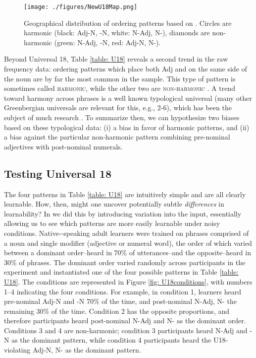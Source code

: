 \documentclass[output=paper]{langsci/langscibook}
\begin{document}
\begin{figure}[t]
\texttt{[image: ./figures/NewU18Map.png]}
\caption{Geographical distribution of ordering patterns based on \cite{wals-87,wals-89}. Circles are harmonic (black: Adj-N, -N, white: N-Adj, N-), diamonds are non-harmonic (green: N-Adj, -N, red: Adj-N, N-).}\label{fig: U18}
\end{figure}


Beyond Universal 18, Table \ref{table: U18} reveals a second trend in the raw frequency data: ordering patterns which place both Adj and  on the same side of the noun are by far the most common in the sample. This type of pattern is sometimes called  \textsc{harmonic}, while the other two are \textsc{non-harmonic} \citep[for discussion of this terminology see][59-62]{croft2003typology}. A trend toward harmony across phrases is a well known typological universal (many other Greenbergian universals are relevant for this, e.g., 2-6), which has been the subject of much research \citep[e.g.,][]{Hawkins83,Travis84,Chomsky88,Dryer92,Baker01}. To summarize then, we can hypothesize two biases based on these typological data: (i) a bias  in favor of harmonic patterns, and (ii) a bias against the particular non-harmonic pattern combining pre-nominal adjectives with post-nominal numerals. 

\subsection{Testing Universal 18}
The four patterns in Table \ref{table: U18} are intuitively simple and are all clearly learnable. How, then, might one uncover potentially subtle \textit{differences} in learnability? In \cite{CulbertsonSmolenskyLegendre12} we did this by introducing variation into the input, essentially allowing us to see which patterns are more easily learnable under noisy conditions. Native--speaking adult learners were trained on phrases comprised of a noun and single modifier (adjective or numeral word), the order of which varied between a dominant order--heard in 70\% of utterances--and the opposite--heard in 30\% of phrases. The dominant order varied randomly across participants in the experiment and instantiated one of the four possible patterns in Table \ref{table: U18}. The conditions are represented in Figure \ref{fig: U18conditions}, with numbers 1--4 indicating the four conditions. For example, in condition 1, learners heard pre-nominal Adj-N and -N 70\% of the time, and post-nominal N-Adj, N- the remaining 30\% of the time. Condition 2 has the opposite proportions, and therefore participants heard post-nominal N-Adj and N- as the dominant order. Conditions 3 and 4 are non-harmonic; condition 3 participants heard N-Adj and -N as the dominant pattern, while condition 4 participants heard the U18-violating Adj-N, N- as the dominant pattern.
\end{document}
